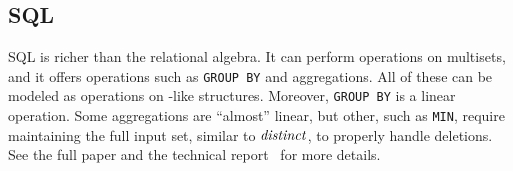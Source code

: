 %
%
%
%
%

\subsection{SQL}

SQL is richer than the relational algebra.  It can perform operations
on multisets, and it offers operations such as \texttt{GROUP BY} and
aggregations.  All of these can be modeled as operations on \zr-like
structures.  Moreover, \texttt{GROUP BY} is a linear operation.  Some
aggregations are ``almost'' linear, but other, such as \texttt{MIN},
require maintaining the full input set, similar to $\mathit{distinct}$, to
properly handle deletions.  See the full paper and the technical
report~\cite{tr} for more details.

